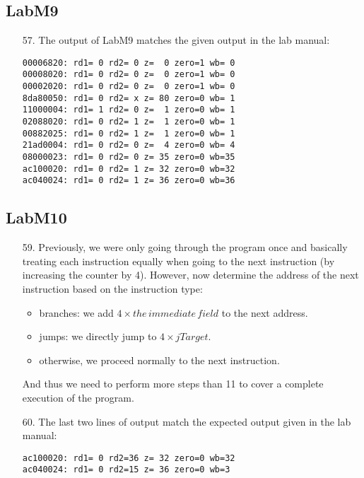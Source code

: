 \documentclass{article}
\begin{document}
\subsection{LabM9}
\begin{enumerate}
\item[57. ] The output of LabM9 matches the given output in the lab manual:
\begin{verbatim}
00006820: rd1= 0 rd2= 0 z=  0 zero=1 wb= 0
00008020: rd1= 0 rd2= 0 z=  0 zero=1 wb= 0
00002020: rd1= 0 rd2= 0 z=  0 zero=1 wb= 0
8da80050: rd1= 0 rd2= x z= 80 zero=0 wb= 1
11000004: rd1= 1 rd2= 0 z=  1 zero=0 wb= 1
02088020: rd1= 0 rd2= 1 z=  1 zero=0 wb= 1
00882025: rd1= 0 rd2= 1 z=  1 zero=0 wb= 1
21ad0004: rd1= 0 rd2= 0 z=  4 zero=0 wb= 4
08000023: rd1= 0 rd2= 0 z= 35 zero=0 wb=35
ac100020: rd1= 0 rd2= 1 z= 32 zero=0 wb=32
ac040024: rd1= 0 rd2= 1 z= 36 zero=0 wb=36
\end{verbatim}
\end{enumerate}

\subsection{LabM10}
\begin{enumerate}
\item[59. ] Previously, we were only going through the program once and basically
treating each instruction equally when going to the next instruction (by 
increasing the counter by 4). However, now determine the address of the next 
instruction based on the instruction type:
\begin{itemize}
\item branches: we add $4 \times the\,immediate\,field$ to the next address.
\item jumps: we directly jump to $4 \times jTarget$.
\item otherwise, we proceed normally to the next instruction.
\end{itemize}
And thus we need to perform more steps than 11 to cover a complete execution
of the program.

\item[60. ] The last two lines of output match the expected output given in the
lab manual:
\begin{verbatim}
ac100020: rd1= 0 rd2=36 z= 32 zero=0 wb=32
ac040024: rd1= 0 rd2=15 z= 36 zero=0 wb=3
\end{verbatim}
\end{enumerate}

\end{document}
